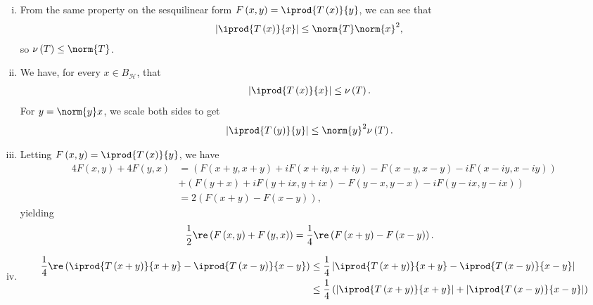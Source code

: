 \documentclass[10pt]{mypackage}
\begin{document}
\begin{solution}\hfill
  \begin{enumerate}[(i)]
    \item From the same property on the sesquilinear form $F\left(x,y\right) = \iprod{T\left(x\right)}{y}$, we can see that
      \begin{align*}
        \left\vert \iprod{T\left(x\right)}{x} \right\vert &\leq \norm{T}\norm{x}^2,
      \end{align*}
      so $\nu\left(T\right)\leq \norm{T}$.
    \item We have, for every $x\in B_{\mathcal{H}}$, that
      \begin{align*}
        \left\vert \iprod{T\left(x\right)}{x} \right\vert &\leq \nu\left(T\right).
      \end{align*}
      For $y = \norm{y} x$, we scale both sides to get
      \begin{align*}
        \left\vert \iprod{T\left(y\right)}{y} \right\vert &\leq \norm{y}^2 \nu\left(T\right).
      \end{align*}
    \item Letting $F\left(x,y\right) = \iprod{T\left(x\right)}{y}$, we have
      \begin{align*}
        4F\left(x,y\right) + 4F\left(y,x\right) &= \left(F\left(x + y,x+y\right) + i F\left(x+iy,x+iy\right) - F\left(x-y,x-y\right) - iF\left(x-iy,x-iy\right)\right)\\
                                              &+ \left(F\left(y+x\right) + iF\left(y+ix,y+ix\right)-F\left(y-x,y-x\right) - iF\left(y-ix,y-ix\right)\right)\\
                                              &= 2\left(F\left(x+y\right) - F\left(x-y\right)\right),
      \end{align*}
      yielding
      \begin{align*}
        \frac{1}{2}\re\left(F\left(x,y\right) + F\left(y,x\right)\right) &= \frac{1}{4}\re\left(F\left(x+y\right)-F\left(x-y\right)\right).
      \end{align*}
    \item 
      \begin{align*}
        \frac{1}{4}\re\left( \iprod{T\left(x+y\right)}{x+y} - \iprod{T\left(x-y\right)}{x-y}\right) &\leq \frac{1}{4}\left\vert \iprod{T\left(x+y\right)}{x+y} - \iprod{T\left(x-y\right)}{x-y} \right\vert\\
                                                                                                    &\leq \frac{1}{4}\left(\left\vert \iprod{T\left(x+y\right)}{x+y} \right\vert + \left\vert \iprod{T\left(x-y\right)}{x-y} \right\vert\right)\\

\end{align*}
\end{enumerate}
\end{solution}
\end{document}
